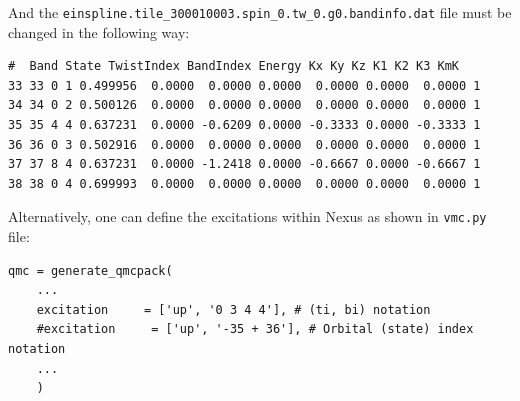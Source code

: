 And the \texttt{einspline.tile\_300010003.spin\_0.tw\_0.g0.bandinfo.dat} file must be changed in the following way: 
\begin{lstlisting}
#  Band State TwistIndex BandIndex Energy Kx Ky Kz K1 K2 K3 KmK
33 33 0	1 0.499956	0.0000  0.0000 0.0000  0.0000 0.0000  0.0000 1
34 34 0	2 0.500126	0.0000  0.0000 0.0000  0.0000 0.0000  0.0000 1
35 35 4	4 0.637231	0.0000 -0.6209 0.0000 -0.3333 0.0000 -0.3333 1
36 36 0	3 0.502916	0.0000  0.0000 0.0000  0.0000 0.0000  0.0000 1
37 37 8	4 0.637231	0.0000 -1.2418 0.0000 -0.6667 0.0000 -0.6667 1
38 38 0	4 0.699993	0.0000  0.0000 0.0000  0.0000 0.0000  0.0000 1
\end{lstlisting}
Alternatively, one can define the excitations within Nexus as shown in \texttt{vmc.py} file:
\begin{lstlisting}
qmc = generate_qmcpack(
    ...
    excitation     = ['up', '0 3 4 4'], # (ti, bi) notation
    #excitation     = ['up', '-35 + 36'], # Orbital (state) index notation
    ...
    )
\end{lstlisting}
